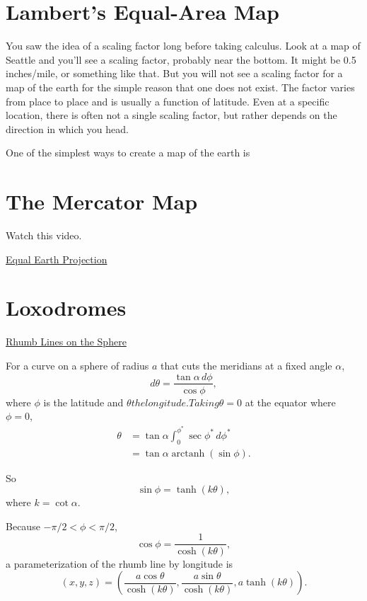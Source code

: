 \documentclass{ximera}
\begin{document}
\section{Lambert's Equal-Area Map}


You saw the idea of a scaling factor long before taking calculus. Look at a map of Seattle and you'll see a scaling factor, probably near the bottom. It might be 0.5 inches/mile, or something like that. But you will not see a scaling factor for a map of the earth for the simple reason that one does not exist. The factor varies from place to place and is usually a function of latitude. Even at a specific location, there is often not a single scaling factor, but rather depends on the direction in which you head. 



One of the simplest ways to create a map of the earth is 


\section{The Mercator Map}

Watch this video.

\href{https://www.nytimes.com/2025/08/19/world/africa/africa-map-mercator.html}{Equal Earth Projection}


\section{Loxodromes}

\href{https://mathcurve.com/courbes3d.gb/loxodromie/sphereloxodromie.shtml}{Rhumb Lines on the Sphere}

For a curve on a sphere of radius $a$ that cuts the meridians at a fixed angle $\alpha$,
\[
  d\theta = \frac{\tan \alpha \, d\phi}{\cos\phi} ,
\]
where $\phi$ is the latitude and $\theta the longitude. Taking \theta = 0$ at the equator where $\phi=0$,
\begin{align*}
 \theta     &= \tan \alpha \int_0^{\phi^*} \sec \phi^* \, d\phi^*\\
               &= \tan \alpha \operatorname{arctanh}(\sin\phi) .
\end{align*}

So
\[
   \sin\phi = \operatorname{tanh}(k \theta),
\]
where $k=\cot\alpha$.

Because $-\pi/2 < \phi < \pi/2$,
\[
  \cos\phi =  \frac{1}{\cosh (k \theta)},
\]
a parameterization of the rhumb line by longitude is
\[
  (x,y,z) = \left( \frac{a\cos\theta}{\cosh(k\theta)} , \frac{a\sin\theta}{\cosh(k\theta)}  , a \tanh(k\theta)  \right) .
\]
\end{document}
